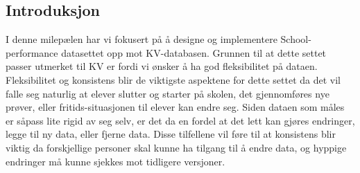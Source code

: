 \subsection{Introduksjon}
I denne milepælen har vi fokusert på å designe og implementere School-performance datasettet opp mot KV-databasen. Grunnen til at dette settet passer utmerket til KV er fordi vi ønsker å ha god fleksibilitet på dataen. Fleksibilitet og konsistens blir de viktigste aspektene for dette settet da det vil falle seg naturlig at elever slutter og starter på skolen, det gjennomføres nye prøver, eller fritids-situasjonen til elever kan endre seg. Siden dataen som måles er såpass lite rigid av seg selv, er det da en fordel at det lett kan gjøres endringer, legge til ny data, eller fjerne data. Disse tilfellene vil føre til at konsistens blir viktig da forskjellige personer skal kunne ha tilgang til å endre data, og hyppige endringer må kunne sjekkes mot tidligere versjoner.